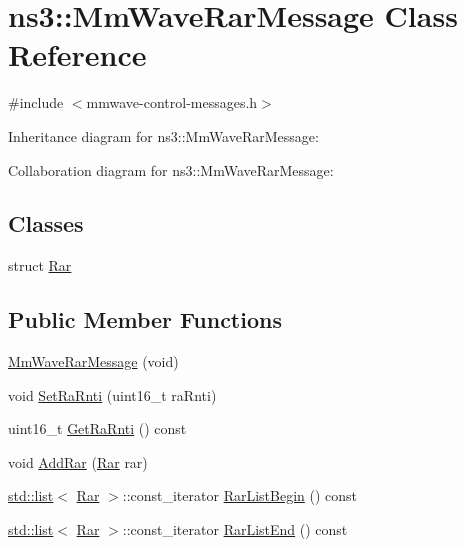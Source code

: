 \hypertarget{classns3_1_1MmWaveRarMessage}{}\section{ns3\+:\+:Mm\+Wave\+Rar\+Message Class Reference}
\label{classns3_1_1MmWaveRarMessage}


{\ttfamily \#include $<$mmwave-\/control-\/messages.\+h$>$}



Inheritance diagram for ns3\+:\+:Mm\+Wave\+Rar\+Message\+:


Collaboration diagram for ns3\+:\+:Mm\+Wave\+Rar\+Message\+:
\subsection*{Classes}
\begin{DoxyCompactItemize}
\item 
struct \hyperlink{structns3_1_1MmWaveRarMessage_1_1Rar}{Rar}
\end{DoxyCompactItemize}
\subsection*{Public Member Functions}
\begin{DoxyCompactItemize}
\item 
\hyperlink{classns3_1_1MmWaveRarMessage_ac2dafe590d9f1e1b563c714c45718806}{Mm\+Wave\+Rar\+Message} (void)
\item 
void \hyperlink{classns3_1_1MmWaveRarMessage_af838162c6335a37b289516c07f1f5421}{Set\+Ra\+Rnti} (uint16\+\_\+t ra\+Rnti)
\item 
uint16\+\_\+t \hyperlink{classns3_1_1MmWaveRarMessage_a29608f509fb8d5334d391eeed6ea939b}{Get\+Ra\+Rnti} () const 
\item 
void \hyperlink{classns3_1_1MmWaveRarMessage_a843a35a13282fdd9e90765f3fd1b56b7}{Add\+Rar} (\hyperlink{structns3_1_1MmWaveRarMessage_1_1Rar}{Rar} rar)
\item 
\hyperlink{openflow-interface_8h_afd9bcfa176617760671b67580f536fa7}{std\+::list}$<$ \hyperlink{structns3_1_1MmWaveRarMessage_1_1Rar}{Rar} $>$\+::const\+\_\+iterator \hyperlink{classns3_1_1MmWaveRarMessage_acea35a6e494b98e3e444eb055fb4ec7a}{Rar\+List\+Begin} () const 
\item 
\hyperlink{openflow-interface_8h_afd9bcfa176617760671b67580f536fa7}{std\+::list}$<$ \hyperlink{structns3_1_1MmWaveRarMessage_1_1Rar}{Rar} $>$\+::const\+\_\+iterator \hyperlink{classns3_1_1MmWaveRarMessage_ae6550820c3b5984b1c254b98e56201ee}{Rar\+List\+End} () const 
\end{DoxyCompactItemize}
